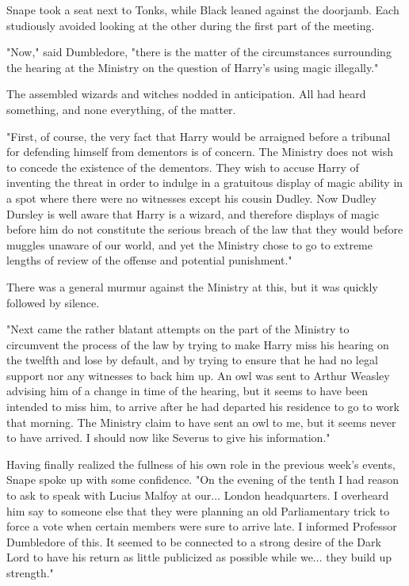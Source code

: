 \documentclass[a4paper,11pt]{article}
\begin{document}
Snape took a seat next to Tonks, while Black leaned against the doorjamb. Each studiously avoided looking at the other during the first part of the meeting.

"Now," said Dumbledore, "there is the matter of the circumstances surrounding the hearing at the Ministry on the question of Harry's using magic illegally."

The assembled wizards and witches nodded in anticipation. All had heard something, and none everything, of the matter.

"First, of course, the very fact that Harry would be arraigned before a tribunal for defending himself from dementors is of concern. The Ministry does not wish to concede the existence of the dementors. They wish to accuse Harry of inventing the threat in order to indulge in a gratuitous display of magic ability in a spot where there were no witnesses except his cousin Dudley. Now Dudley Dursley is well aware that Harry is a wizard, and therefore displays of magic before him do not constitute the serious breach of the law that they would before muggles unaware of our world, and yet the Ministry chose to go to extreme lengths of review of the offense and potential punishment."

There was a general murmur against the Ministry at this, but it was quickly followed by silence.

"Next came the rather blatant attempts on the part of the Ministry to circumvent the process of the law by trying to make Harry miss his hearing on the twelfth and lose by default, and by trying to ensure that he had no legal support nor any witnesses to back him up. An owl was sent to Arthur Weasley advising him of a change in time of the hearing, but it seems to have been intended to miss him, to arrive after he had departed his residence to go to work that morning. The Ministry claim to have sent an owl to me, but it seems never to have arrived. I should now like Severus to give his information."

Having finally realized the fullness of his own role in the previous week's events, Snape spoke up with some confidence. "On the evening of the tenth I had reason to ask to speak with Lucius Malfoy at our... London headquarters. I overheard him say to someone else that they were planning an old Parliamentary trick to force a vote when certain members were sure to arrive late. I informed Professor Dumbledore of this. It seemed to be connected to a strong desire of the Dark Lord to have his return as little publicized as possible while we... they build up strength."
\end{document}
